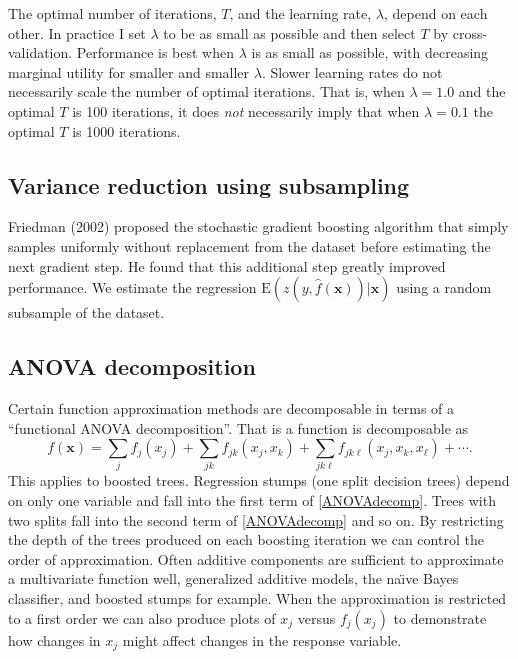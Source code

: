 \documentclass{article}
\newcommand{\EV}{\mathrm{E}}
\begin{document}
The optimal number of iterations, $T$, and the learning rate,
$\lambda$, depend on each other. In practice I set $\lambda$ to be as
small as possible and then select $T$ by cross-validation. Performance
is best when $\lambda$ is as small as possible, with
decreasing marginal utility for smaller and smaller $\lambda$. Slower
learning rates do not necessarily scale the number of optimal
iterations. That is, when $\lambda=1.0$ and the optimal $T$ is 100
iterations, it does {\it not} necessarily imply that when $\lambda=0.1$
the optimal $T$ is 1000 iterations.

\subsection{Variance reduction using subsampling}

Friedman (2002) proposed the stochastic gradient boosting algorithm
that simply samples uniformly without replacement from the dataset
before estimating the next gradient step. He found that this
additional step greatly improved performance. We estimate the
regression $\EV(z(y,\hat f(\mathbf{x}))|\mathbf{x})$ using a random
subsample of the dataset.

\subsection{ANOVA decomposition}

Certain function approximation methods are decomposable in terms of a
``functional ANOVA decomposition''. That is a function is decomposable
as
\begin{equation} 
\label{ANOVAdecomp} 
f(\mathbf{x}) = \sum_j f_j(x_j) + \sum_{jk} f_{jk}(x_j,x_k) + \sum_{jk\ell} f_{jk\ell}(x_j,x_k,x_\ell) + \cdots. 
\end{equation}
This applies to boosted trees. Regression stumps (one split decision
trees) depend on only one variable and fall into the first term of
\ref{ANOVAdecomp}. Trees with two splits fall into the second term of
\ref{ANOVAdecomp} and so on. By restricting the depth of the trees
produced on each boosting iteration we can control the order of
approximation. Often additive components are sufficient to approximate
a multivariate function well, generalized additive models, the
na\"{\i}ve Bayes classifier, and boosted stumps for example. When the
approximation is restricted to a first order we can also produce plots
of $x_j$ versus $f_j(x_j)$ to demonstrate how changes in $x_j$ might
affect changes in the response variable.
\end{document}
